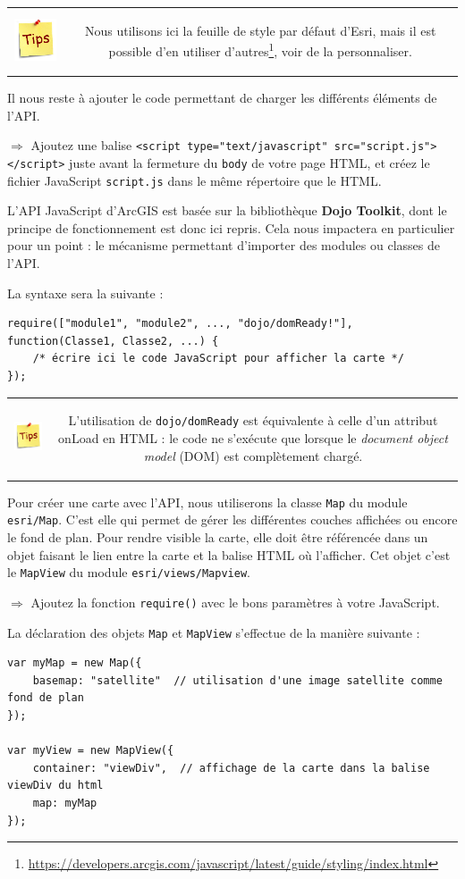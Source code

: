 \documentclass[11pt]{article}
\newcommand{\action}{$\Rightarrow$ }
\newenvironment{note}{%
	\begin{tabular}[t t]{c c}
		\includegraphics{img/tips.png}
		 &
		\begin{minipage}[c]{0.9\linewidth}
			\begin{sffamily}
}{%
			\end{sffamily}
		\end{minipage}
	\end{tabular}	
}
\newcommand{\code}[1]{\lstinline{#1}}
\begin{document}
\begin{note}
Nous utilisons ici la feuille de style par défaut d'Esri, mais il est possible d'en utiliser d'autres\footnote{\url{https://developers.arcgis.com/javascript/latest/guide/styling/index.html}}, voir de la personnaliser.
\end{note}

Il nous reste à ajouter le code permettant de charger les différents éléments de l'API. 

\action Ajoutez une balise \code{<script type="text/javascript" src="script.js"></script>} juste avant la fermeture du \code{body} de votre page HTML, et créez le fichier JavaScript \code{script.js} dans le même répertoire que le HTML.

L'API JavaScript d'ArcGIS est basée sur la bibliothèque \textbf{Dojo Toolkit}, dont le principe de fonctionnement est donc ici repris. Cela nous impactera en particulier pour un point : le mécanisme permettant d'importer des modules ou classes de l'API.

La syntaxe sera la suivante :
\begin{lstlisting}
require(["module1", "module2", ..., "dojo/domReady!"], function(Classe1, Classe2, ...) {
	/* écrire ici le code JavaScript pour afficher la carte */
});
\end{lstlisting}

\begin{note}
L'utilisation de \code{dojo/domReady} est équivalente à celle d'un attribut onLoad en HTML : le code ne s'exécute que lorsque le \textit{document object model} (DOM) est complètement chargé.
\end{note}

Pour créer une carte avec l'API, nous utiliserons la classe \code{Map} du module \code{esri/Map}. C'est elle qui permet de gérer les différentes couches affichées ou encore le fond de plan. Pour rendre visible la carte, elle doit être référencée dans un objet faisant le lien entre la carte et la balise HTML où l'afficher. Cet objet c'est le \code{MapView} du module \code{esri/views/Mapview}.

\action Ajoutez la fonction \code{require()} avec le bons paramètres à votre JavaScript.

La déclaration des objets \code{Map} et \code{MapView} s'effectue de la manière suivante :
\begin{lstlisting}
var myMap = new Map({
    basemap: "satellite"  // utilisation d'une image satellite comme fond de plan
});

var myView = new MapView({
	container: "viewDiv",  // affichage de la carte dans la balise viewDiv du html
	map: myMap
});
\end{lstlisting}
\end{document}
